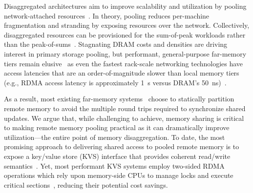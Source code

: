 Disaggregated architectures aim to improve scalability and utilization
by pooling network-attached
resources~\cite{dredbox,firebox,blade-server,legoos}.  In theory,
pooling reduces per-machine fragmentation and stranding by exposing
resources over the network. Collectively, disaggregated resources can
be provisioned for the sum-of-peak workloads rather than the
peak-of-sums~\cite{dsnf,supernic}.  Stagnating DRAM costs and
densities are driving interest in primary storage pooling, but
performant, general-purpose far-memory tiers remain
elusive~\cite{fastswap,3po,kona,infiniswap,hydra,leap,legoos,dilos} as
even the fastest rack-scale networking technologies have access
latencies that are an order-of-magnitude slower than local memory
tiers
(e.g., RDMA access latency is approximately 1~{\textmu}s versus DRAM's
50~ns)~\cite{clover}.



As a result, most existing far-memory systems~\cite{kona,mira,aifm,trackfm,carbink} choose to statically partition remote memory to avoid the multiple round trips required to 
synchronize shared updates.
We argue that, while challenging to achieve, memory sharing is
critical to making remote memory pooling practical as it can
dramatically improve utilization---the entire point of memory
disaggregation.  To date, the most promising approach to delivering
shared access to pooled remote memory is to expose a key/value store
(KVS) interface that provides coherent read/write
semantics~\cite{rolex,smart,ditto,fusee,clover,sherman,ford}.  Yet,
most performant KVS systems employ two-sided RDMA operations which rely upon
memory-side CPUs to manage locks and execute critical
sections~\cite{memc3,cuckoo-improvements,pilaf,cell}, reducing their
potential cost savings.

